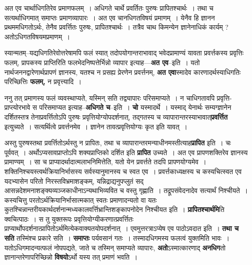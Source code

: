 \documentclass[article,12pt,a4paper]{memoir}
\begin{document}
	  \pstart {}अत एव चार्थाधिगतिरेव प्रमाणफलम् । अधिगते चार्थे प्रवर्तितः पुरुषः प्रापितश्चार्थः । तथा च सत्यर्थाधिगमात् समाप्तः प्रमाणव्यापारः । अत एव चानधिगतविषयं प्रमाणम् । येनैव हि ज्ञानन प्रथममधिगतोऽर्थः, तेनैव प्रवर्त्तितः पुरुषः, प्रापितश्चार्थः । तत्रैव चाथ किमन्येन ज्ञानेनाधिकं कार्यम् ? अतोऽधिगतविषयमप्रमाणम् ।
	\pend
      
	  \endgroup
	

	  \pstart स्यान्मतम्--यद्यधिगतिरेवोत्तरेषामपि फलं स्यात् तदोपयोगान्तराभावाद् भवेदप्रामाण्यं यावता प्रवर्त्तकस्य प्रवृत्तिः फलम्, प्रापकस्य प्राप्तिरिति फलभेदनिष्पत्तेर्भिन्नो व्यापार इत्याह—\textbf{अत एव}--इति । यतो नार्थजननद्वारेणार्थप्रापणं ज्ञानस्य, यतश्च न प्रसह्य प्रेरणेन प्रवर्त्तनम्, \textbf{अत एवा}स्मादेव कारणादर्थस्याधिगतिः परिच्छित्तिः \textbf{फलम्,} न प्रवृत्त्यादि ।
	\pend
      

	  \pstart ननु तत् प्रमाणस्य फलं व्यवस्थाप्यते, यस्मिन् सति तद्व्यापारः परिसमाप्यते । न चाधिगतावपि प्रवृत्ति-प्राप्त्योरभावे स परिसमाप्यत इत्याह--\textbf{अधिगते च}--इति । \textbf{चो} यस्मादर्थे । यस्माद् येनार्थः सम्यग्ज्ञानेन दर्शितस्तत्र तेनाप्रवर्त्तितोऽपि पुरुषः प्रवृत्तियोग्योपदर्शनात्, तद्गतस्य च व्यापारान्तरस्याभावात्\textbf{प्रवर्त्तित} इत्युच्यते । सत्यर्थित्वे प्रवर्त्तनमेव । ज्ञानेन तावत्प्रवृत्तियोग्यः कृत इति यावत् ।
	\pend
      

	  \pstart अस्तु पुरुषस्तथा प्रवर्त्तितोऽर्थस्तु न प्रापितः, तथा च व्यापारान्तरमन्याधीनमस्तीत्याह\textbf{प्रापित} इति । चः पूर्ववत् । अर्थोऽप्यसावप्राप्तोऽपि शक्यप्राप्तिको दर्शित इति \textbf{प्रापित} उच्यते । अत एव प्रापणशक्तिरेव ज्ञानस्य प्रामाण्यम् । सा च प्राप्यादर्थादात्मलाभनिमित्तेति, यतो \leavevmode{} येन प्रवर्त्तते तदपि प्रापणयोग्यमेव । शक्तिनिश्चयस्त्वर्थक्रियानिर्भासस्य सर्वस्यानुमानस्य च स्वत एव । प्रवर्त्तकाध्यक्षस्य च कस्यचित्स्वत एव यदभ्यासेन परितो निरस्तविभ्रमाशङ्कम्, यन्निद्राद्यनुपप्लुतं सद् आसन्नदेशमनाशङ्क्यव्यञ्जकाधीनाऽन्यथाभिव्यवित च वस्तु गृह्णाति । तद्रूपसंवेदनादेव सत्यार्थं निश्चीयते । कस्यचित्तु परतोऽर्थक्रियानिर्भासात्मकात् स्वतः प्रमाणादन्यतो वा यतः कुतश्चिन्नान्तरीयकार्थदर्शनान्मध्यकालवर्त्तिभ्रान्तिशङ्कापनोदेन निश्चीयत इति । \textbf{प्रापितश्चार्थमि}ति क्वचित्पाठः । स तु युक्तरूपः प्रवृत्तियोग्यीकरणात्प्रवर्त्तितः प्राप्यार्थोपदर्शनात्प्रापितोऽर्थमित्येकवाक्यतयोपदर्शनात् । एवमुत्तरत्राऽप्येष एव पाठोऽवदात इति । \textbf{तथा च सति} तस्मिंश्च प्रकारे सति । \textbf{समाप्तः} पर्यवसानं गतः । तस्मादधिगमस्य फलत्वं युक्तमिति भावः । यतोऽधिगमादन्यत्फलं नोपपद्यते, जाते च तस्मिन् समाप्यते व्यापारः, \textbf{अतो}ऽस्मात्कारणाद् \textbf{अनधिग}तो ज्ञानान्तरेणापरिच्छिन्नो \textbf{विषयो}ऽर्थो यस्य तत् प्रमाणं भवति ।
	\pend
      
\end{document}
